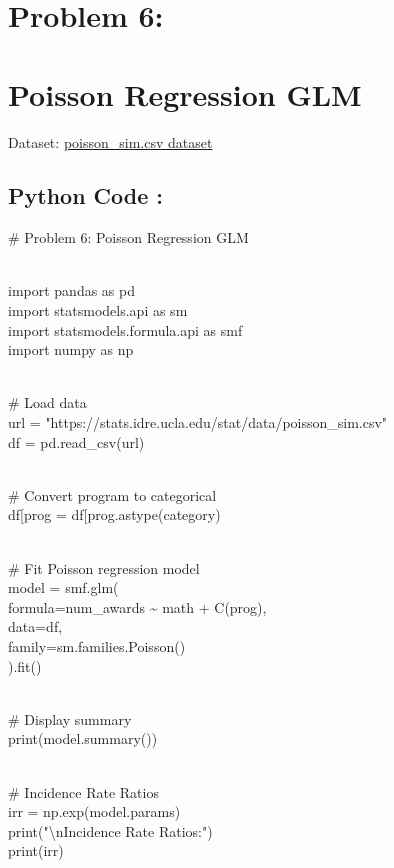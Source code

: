 \documentclass[
]{article}
\begin{document}
\section{\texorpdfstring{\textbf{Problem
6:}}{Problem 6:}}\label{problem-6}

\section{\texorpdfstring{ Poisson Regression
GLM}{ Poisson Regression GLM}}\label{poisson-regression-glm}

Dataset:
\href{https://stats.idre.ucla.edu/stat/data/poisson_sim.csv?utm_source=chatgpt.com}{poisson\_sim.csv
dataset}

\subsection{\texorpdfstring{\textbf{Python Code
:}}{Python Code :}}\label{python-code-11}

\# Problem 6: Poisson Regression GLM\\
\strut \\
import pandas as pd\\
import statsmodels.api as sm\\
import statsmodels.formula.api as smf\\
import numpy as np\\
\strut \\
\# Load data\\
url = "https://stats.idre.ucla.edu/stat/data/poisson\_sim.csv"\\
df = pd.read\_csv(url)\\
\strut \\
\# Convert program to categorical\\
df{[}\textquotesingle prog\textquotesingle{]} =
df{[}\textquotesingle prog\textquotesingle{]}.astype(\textquotesingle category\textquotesingle)\\
\strut \\
\# Fit Poisson regression model\\
model = smf.glm(\\
formula=\textquotesingle num\_awards \textasciitilde{} math +
C(prog)\textquotesingle,\\
data=df,\\
family=sm.families.Poisson()\\
).fit()\\
\strut \\
\# Display summary\\
print(model.summary())\\
\strut \\
\# Incidence Rate Ratios\\
irr = np.exp(model.params)\\
print("\textbackslash nIncidence Rate Ratios:")\\
print(irr)
\end{document}
